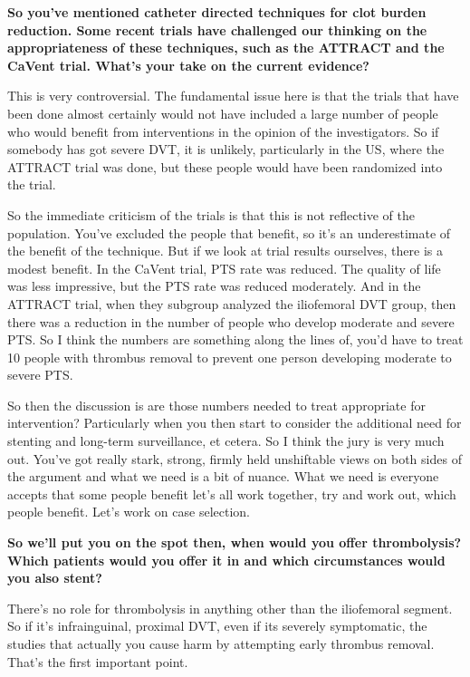 \documentclass[
]{book}
\begin{document}
\textbf{So you've mentioned catheter directed techniques for clot burden
reduction. Some recent trials have challenged our thinking on the
appropriateness of these techniques, such as the ATTRACT and the CaVent
trial. What's your take on the current evidence?}

This is very controversial. The fundamental issue here is that the
trials that have been done almost certainly would not have included a
large number of people who would benefit from interventions in the
opinion of the investigators. So if somebody has got severe DVT, it is
unlikely, particularly in the US, where the ATTRACT trial was done, but
these people would have been randomized into the trial.

So the immediate criticism of the trials is that this is not reflective
of the population. You've excluded the people that benefit, so it's an
underestimate of the benefit of the technique. But if we look at trial
results ourselves, there is a modest benefit. In the CaVent trial, PTS
rate was reduced. The quality of life was less impressive, but the PTS
rate was reduced moderately.\citep{haig2016} And in the ATTRACT trial, when
they subgroup analyzed the iliofemoral DVT group, then there was a
reduction in the number of people who develop moderate and severe PTS.
So I think the numbers are something along the lines of, you'd have to
treat 10 people with thrombus removal to prevent one person developing
moderate to severe PTS.\citep{vedantham2017}

So then the discussion is are those numbers needed to treat appropriate
for intervention? Particularly when you then start to consider the
additional need for stenting and long-term surveillance, et cetera. So I
think the jury is very much out. You've got really stark, strong, firmly
held unshiftable views on both sides of the argument and what we need is
a bit of nuance. What we need is everyone accepts that some people
benefit let's all work together, try and work out, which people benefit.
Let's work on case selection.

\textbf{So we'll put you on the spot then, when would you offer thrombolysis?
Which patients would you offer it in and which circumstances would you
also stent?}

There's no role for thrombolysis in anything other than the iliofemoral
segment. So if it's infrainguinal, proximal DVT, even if its severely
symptomatic, the studies that actually you cause harm by attempting
early thrombus removal. That's the first important point.
\end{document}
